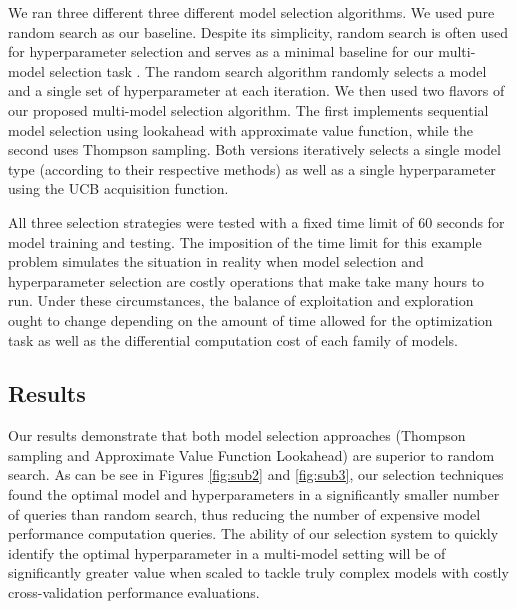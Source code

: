 \documentclass{article}
\begin{document}
We ran three different three different model selection algorithms. We used pure random search as our baseline. Despite its simplicity, random search is often used for hyperparameter selection and serves as a minimal baseline for our multi-model selection task \cite{bengio}. The random search algorithm randomly selects a model and a single set of hyperparameter at each iteration. We then used two flavors of our proposed multi-model selection algorithm. The first implements sequential model selection using lookahead with approximate value function, while the second uses Thompson sampling. Both versions iteratively selects a single model type (according to their respective methods) as well as a single hyperparameter using the UCB acquisition function.

All three selection strategies were tested with a fixed time limit of $60$ seconds for model training and testing. The imposition of the time limit for this example problem simulates the situation in reality when model selection and hyperparameter selection are costly operations that make take many hours to run. Under these circumstances, the balance of exploitation and exploration ought to change depending on the amount of time allowed for the optimization task as well as the differential computation cost of each family of models.

\subsection{Results}
Our results demonstrate that both model selection approaches (Thompson sampling and Approximate Value Function Lookahead) are superior to random search. As can be see in Figures \ref{fig:sub2} and \ref{fig:sub3}, our selection techniques found the optimal model and hyperparameters in a significantly smaller number of queries than random search, thus reducing the number of expensive model performance computation queries. The ability of our selection system to quickly identify the optimal hyperparameter in a multi-model setting will be of significantly greater value when scaled to tackle truly complex models with costly cross-validation performance evaluations. 
\end{document}
